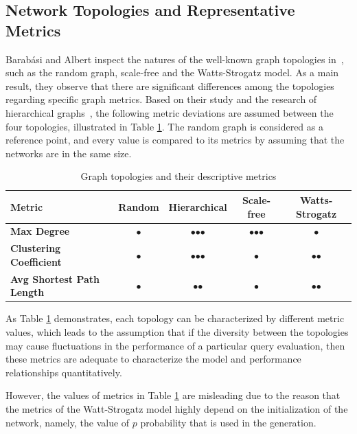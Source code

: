 \subsection{Network Topologies and Representative Metrics}

Barabási and Albert inspect the natures of the well-known graph topologies in~\cite{statistical_mechanics}, such as the random graph, scale-free and the Watts-Strogatz model. As a main result, they observe that there are significant differences among the topologies regarding specific graph metrics. Based on their study and the research of hierarchical graphs~\cite{hierarchical}, the following metric deviations are assumed	between the four topologies, illustrated in Table \ref{tab:topology_metrics}. The random graph is considered as a reference point, and every value is compared to its metrics by assuming that the networks are in the same size.
\begin{table}[ht]
	\footnotesize
	\centering
	\begin{tabular}{ l c c c c}
		\toprule
		Metric & Random & Hierarchical & Scale-free & Watts-Strogatz \\ 
		\midrule 
		\textbf{Max Degree} & $\bullet$ & $\bullet$$\bullet$$\bullet$ & $\bullet$$\bullet$$\bullet$ & $\bullet$ \\ \hline
		\textbf{Clustering Coefficient} & $\bullet$ & $\bullet$$\bullet$$\bullet$ & $\bullet$ & $\bullet$$\bullet $\\ \hline
		\textbf{Avg Shortest Path Length} & $\bullet$ & $\bullet$$\bullet$ & $\bullet$ & $\bullet$$\bullet$ \\ \hline
		\bottomrule
	\end{tabular}
	\caption{Graph topologies and their descriptive metrics}
	\label{tab:topology_metrics}
\end{table}
As Table \ref{tab:topology_metrics} demonstrates, each topology can be characterized by different metric values, which leads to the assumption that if the diversity between the topologies may cause fluctuations in the performance of a particular query evaluation, then these metrics are adequate to characterize the model and performance relationships quantitatively.


However, the values of metrics in Table \ref{tab:topology_metrics} are misleading due to the reason that the metrics of the Watt-Strogatz model highly depend on the initialization of the network, namely, the value of $p$ probability that is used in the generation.

